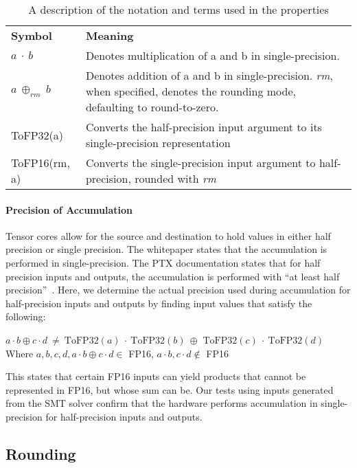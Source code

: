 \begin{table}
\centering
\caption{\label{tab:notation}A description of the notation and terms used in the properties}
\begin{tabularx}{\linewidth}{lX}
\hline
\textbf{Symbol} & \textbf{Meaning} \\
$a~\cdot~b$ & Denotes multiplication of a and b in single-precision. \\
$a~\oplus_{rm}~b$ & Denotes addition of a and b in single-precision. \textit{rm}, when specified, denotes the rounding mode, defaulting to round-to-zero. \\
ToFP32(a) & Converts the half-precision input argument to its single-precision representation \\
ToFP16(rm, a) & Converts the single-precision input argument to half-precision, rounded with \textit{rm} \\
\hline
\end{tabularx}
\end{table}

\paragraph{Precision of Accumulation}
Tensor cores allow for the source and destination to hold values in either half precision or single precision.  The whitepaper states that the accumulation is performed in single-precision.  
The PTX documentation states that for half precision inputs and outputs, the accumulation is performed with ``at least half precision''~\cite[\S9.7.13.4.14]{ptx-isa-73}.
Here, we determine the actual precision used during accumulation for half-precision inputs and outputs by finding input values that satisfy the following:

\begin{myprop}\label{thm:accum-prec}
    $a \cdot b \oplus c \cdot d~\neq~\text{ToFP32}(a)~\cdot~\text{ToFP32}(b)~\oplus$ 
    $\text{ToFP32}(c)~\cdot~\text{ToFP32}(d)$\\
    Where $a, b, c, d, a\cdot b \oplus c\cdot d \in$ FP16, $a \cdot b, c \cdot d \not\in$ FP16
\end{myprop}

This states that certain FP16 inputs can yield products that cannot be represented in FP16, but whose sum can be. 
Our tests using inputs generated from the SMT solver 
confirm that the hardware performs accumulation in single-precision for half-precision inputs and outputs.


\subsection{Rounding}

